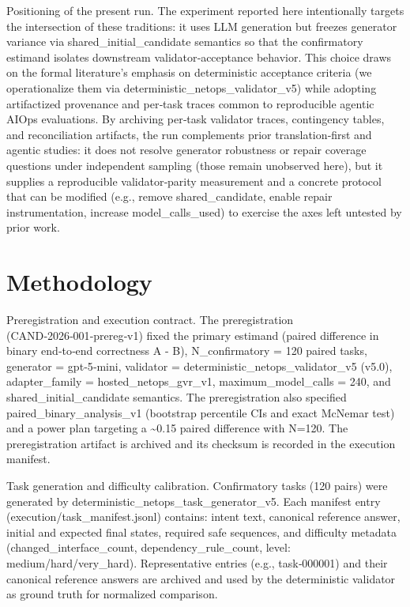 \documentclass[conference]{IEEEtran}
\begin{document}
Positioning of the present run. The experiment reported here intentionally targets the intersection of these traditions: it uses LLM generation but freezes generator variance via shared\_initial\_candidate semantics so that the confirmatory estimand isolates downstream validator‑acceptance behavior. This choice draws on the formal literature's emphasis on deterministic acceptance criteria (we operationalize them via deterministic\_netops\_validator\_v5) while adopting artifactized provenance and per‑task traces common to reproducible agentic AIOps evaluations. By archiving per‑task validator traces, contingency tables, and reconciliation artifacts, the run complements prior translation‑first and agentic studies: it does not resolve generator robustness or repair coverage questions under independent sampling (those remain unobserved here), but it supplies a reproducible validator‑parity measurement and a concrete protocol that can be modified (e.g., remove shared\_candidate, enable repair instrumentation, increase model\_calls\_used) to exercise the axes left untested by prior work.

\section{Methodology}
Preregistration and execution contract. The preregistration (CAND‑2026‑001‑prereg‑v1) fixed the primary estimand (paired difference in binary end‑to‑end correctness A - B), N\_confirmatory = 120 paired tasks, generator = gpt‑5‑mini, validator = deterministic\_netops\_validator\_v5 (v5.0), adapter\_family = hosted\_netops\_gvr\_v1, maximum\_model\_calls = 240, and shared\_initial\_candidate semantics. The preregistration also specified paired\_binary\_analysis\_v1 (bootstrap percentile CIs and exact McNemar test) and a power plan targeting a \textasciitilde{}0.15 paired difference with N=120. The preregistration artifact is archived and its checksum is recorded in the execution manifest.

Task generation and difficulty calibration. Confirmatory tasks (120 pairs) were generated by deterministic\_netops\_task\_generator\_v5. Each manifest entry (execution/task\_manifest.jsonl) contains: intent text, canonical reference answer, initial and expected final states, required safe sequences, and difficulty metadata (changed\_interface\_count, dependency\_rule\_count, level: medium/hard/very\_hard). Representative entries (e.g., task‑000001) and their canonical reference answers are archived and used by the deterministic validator as ground truth for normalized comparison.
\end{document}
